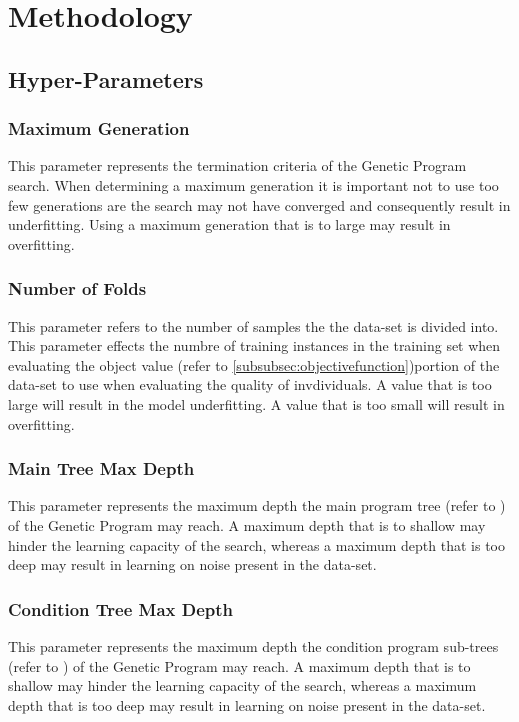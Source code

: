 \documentclass[a4paper,12pt]{article}
\begin{document}
\section{Methodology} \label{sec:methodology}
    \subsection{Hyper-Parameters}
        \subsubsection*{Maximum Generation} \label{subsubsec:mg}
            \par{
                \noindent
                This parameter represents the termination criteria of the Genetic Program search. When determining a maximum generation it is important 
                not to use too few generations are the search may not have converged and consequently result in underfitting. Using a maximum 
                generation that is to large may result in overfitting.  
            }
        \subsubsection*{Number of Folds} \label{subsubsec:kf}
            \par{
                \noindent
                This parameter refers to the number of samples the the data-set is divided into. This parameter effects the numbre of training instances in 
                the training set when evaluating the object value (refer to \ref{subsubsec:objectivefunction})portion of the data-set to use when evaluating the quality of invdividuals. 
                A value that is too large will result in the model underfitting. A value that is too small will result 
                in overfitting.
            }
        \subsubsection*{Main Tree Max Depth} \label{subsubsec:mmd}
            \par{
                \noindent 
                This parameter represents the maximum depth the main program tree (refer to ) of the Genetic Program may reach. A maximum depth that is to shallow may 
                hinder the learning capacity of the search, whereas a maximum depth that is too deep may result in learning on noise present in the data-set. 
            }
        \subsubsection*{Condition Tree Max Depth} \label{subsubsec:cmd}
            \par{
                \noindent 
                This parameter represents the maximum depth the condition program sub-trees (refer to ) of the Genetic Program may reach. A maximum depth that is to shallow may 
                hinder the learning capacity of the search, whereas a maximum depth that is too deep may result in learning on noise present in the data-set. 
            }
\end{document}
